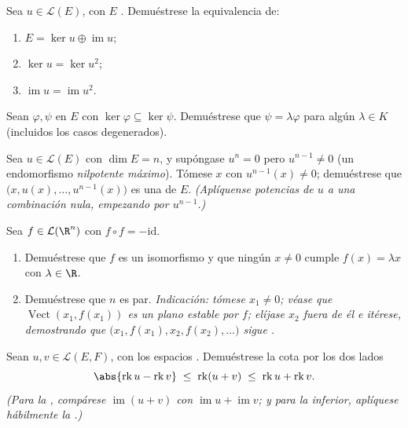\begin{exercise}[$\star\star$]\label{exo:b1:linmaps:7}
Sea $u \in \mathcal{L}(E)$, con $E$ .
Demuéstrese la equivalencia de:
\begin{enumerate}
  \item $E = \ker u \oplus \operatorname{im} u$;
  \item $\ker u = \ker u^2$;
  \item $\operatorname{im} u = \operatorname{im} u^2$.
\end{enumerate}
\end{exercise}

\begin{exercise}[$\star\star$]\label{exo:b1:linmaps:8}
Sean $\varphi, \psi$  en $E$ con
$\ker\varphi \subseteq \ker\psi$. Demuéstrese que
$\psi = \lambda\varphi$ para algún $\lambda \in K$ (incluidos los
casos degenerados).
\end{exercise}

\begin{exercise}[$\star\star\star$]\label{exo:b1:linmaps:9}
Sea $u \in \mathcal{L}(E)$ con $\dim E = n$, y supóngase $u^n = 0$
pero $u^{n-1} \neq 0$ (un endomorfismo \emph{nilpotente máximo}).
Tómese $x$ con $u^{n-1}(x) \neq 0$; demuéstrese que
$\bigl(x, u(x), \dots, u^{n-1}(x)\bigr)$ es una  de $E$.
\emph{(Aplíquense potencias de $u$ a una combinación nula, empezando
por $u^{n-1}$.)}
\end{exercise}

\begin{exercise}[$\star\star\star$]\label{exo:b1:linmaps:10}
Sea $f \in \mathcal{L}(\R^n)$ con $f \circ f = -\mathrm{id}$.
\begin{enumerate}
  \item Demuéstrese que $f$ es un isomorfismo y que ningún
        $x \neq 0$ cumple $f(x) = \lambda x$ con $\lambda \in \R$.
  \item Demuéstrese que $n$ es par. \emph{Indicación: tómese
        $x_1 \neq 0$; véase que $\operatorname{Vect}(x_1, f(x_1))$
        es un plano estable por $f$; elíjase $x_2$ fuera de él e
        itérese, demostrando que
        $\bigl(x_1, f(x_1), x_2, f(x_2), \dots\bigr)$ sigue .}
\end{enumerate}
\end{exercise}

\begin{exercise}[$\star\star$]\label{exo:b1:linmaps:11}
Sean $u, v \in \mathcal{L}(E, F)$, con los espacios . Demuéstrese la cota por los dos lados
\[
\abs{\operatorname{rk} u - \operatorname{rk} v}
\;\leq\; \operatorname{rk}(u + v)
\;\leq\; \operatorname{rk} u + \operatorname{rk} v .
\]
\emph{(Para la , compárese $\operatorname{im}(u+v)$ con
$\operatorname{im} u + \operatorname{im} v$; y para la inferior,
aplíquese hábilmente la .)}
\end{exercise}

